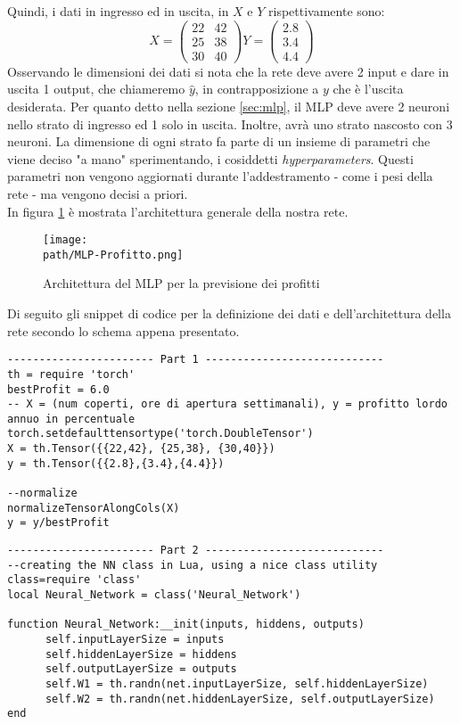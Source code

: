 Quindi, i dati in ingresso ed in uscita, in $X$ e $Y$ rispettivamente sono:
\[
X = \begin{pmatrix}
22 & 42\\
25 & 38 \\
30 & 40
\end{pmatrix}
%
Y = \begin{pmatrix}
2.8\\
3.4 \\
4.4
\end{pmatrix}
\]
Osservando le dimensioni dei dati si nota che la rete deve avere 2 input e dare in uscita 1 output, che chiameremo $\hat{y}$, in contrapposizione a $y$ che è l'uscita desiderata. Per quanto detto nella sezione \ref{sec:mlp}, il MLP deve avere 2 neuroni nello strato di ingresso ed 1 solo in uscita. Inoltre, avrà uno strato nascosto con 3 neuroni. La dimensione di ogni strato fa parte di un insieme di parametri che viene deciso "a mano" sperimentando, i cosiddetti \emph{hyperparameters}. Questi parametri non vengono aggiornati durante l'addestramento - come i pesi della rete - ma vengono decisi a priori. \\In figura \ref{fig:mlp} è mostrata l'architettura generale della nostra rete. \newpage
\begin{figure}[h!]
 \centering
 \texttt{[image: \\path/MLP-Profitto.png]}
 \caption{Architettura del MLP per la previsione dei profitti}
 \label{fig:mlp}
\end{figure}

Di seguito gli snippet di codice per la definizione dei dati e dell'architettura della rete secondo lo schema appena presentato.

\begin{lstlisting}[language={[5.2]Lua}]
----------------------- Part 1 ----------------------------
th = require 'torch'
bestProfit = 6.0
-- X = (num coperti, ore di apertura settimanali), y = profitto lordo annuo in percentuale
torch.setdefaulttensortype('torch.DoubleTensor')
X = th.Tensor({{22,42}, {25,38}, {30,40}})
y = th.Tensor({{2.8},{3.4},{4.4}})

--normalize
normalizeTensorAlongCols(X)
y = y/bestProfit

\end{lstlisting}

\begin{lstlisting}[language={[5.2]Lua}]
----------------------- Part 2 ----------------------------
--creating the NN class in Lua, using a nice class utility
class=require 'class'
local Neural_Network = class('Neural_Network')

function Neural_Network:__init(inputs, hiddens, outputs)
      self.inputLayerSize = inputs
      self.hiddenLayerSize = hiddens
      self.outputLayerSize = outputs
      self.W1 = th.randn(net.inputLayerSize, self.hiddenLayerSize)
      self.W2 = th.randn(net.hiddenLayerSize, self.outputLayerSize)
end
\end{lstlisting}

